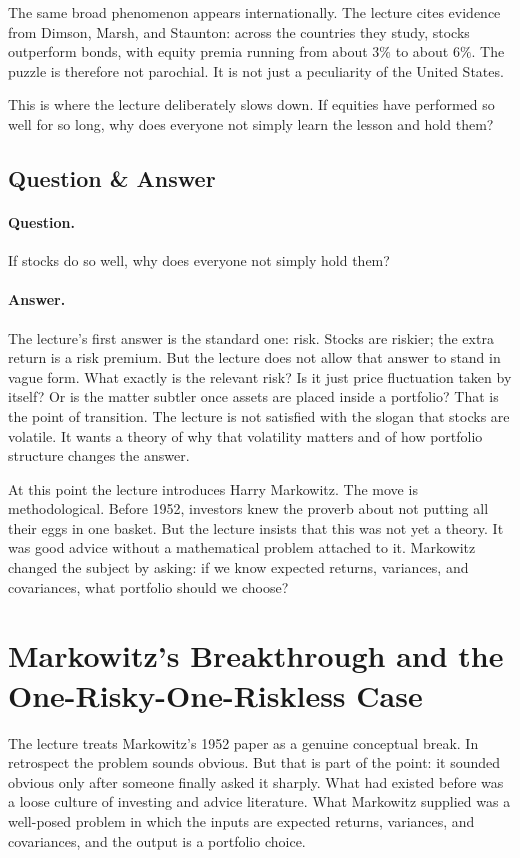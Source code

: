 The same broad phenomenon appears internationally. The lecture cites evidence from Dimson, Marsh, and Staunton: across the countries they study, stocks outperform bonds, with equity premia running from about \(3\%\) to about \(6\%\). The puzzle is therefore not parochial. It is not just a peculiarity of the United States.

This is where the lecture deliberately slows down. If equities have performed so well for so long, why does everyone not simply learn the lesson and hold them?

\subsection{Question \& Answer}

\paragraph{Question.} If stocks do so well, why does everyone not simply hold them?

\paragraph{Answer.} The lecture's first answer is the standard one: risk. Stocks are riskier; the extra return is a risk premium. But the lecture does not allow that answer to stand in vague form. What exactly is the relevant risk? Is it just price fluctuation taken by itself? Or is the matter subtler once assets are placed inside a portfolio? That is the point of transition. The lecture is not satisfied with the slogan that stocks are volatile. It wants a theory of why that volatility matters and of how portfolio structure changes the answer.

At this point the lecture introduces Harry Markowitz. The move is methodological. Before 1952, investors knew the proverb about not putting all their eggs in one basket. But the lecture insists that this was not yet a theory. It was good advice without a mathematical problem attached to it. Markowitz changed the subject by asking: if we know expected returns, variances, and covariances, what portfolio should we choose?

\section{Markowitz's Breakthrough and the One-Risky-One-Riskless Case}

The lecture treats Markowitz's 1952 paper as a genuine conceptual break. In retrospect the problem sounds obvious. But that is part of the point: it sounded obvious only after someone finally asked it sharply. What had existed before was a loose culture of investing and advice literature. What Markowitz supplied was a well-posed problem in which the inputs are expected returns, variances, and covariances, and the output is a portfolio choice.

